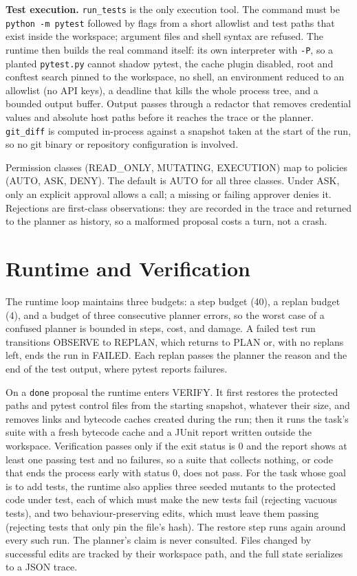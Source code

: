 \documentclass[conference]{IEEEtran}
\begin{document}
\textbf{Test execution.} \texttt{run\_tests} is the only execution tool. The
command must be \texttt{python -m pytest} followed by flags from a short
allowlist and test paths that exist inside the workspace; argument files and
shell syntax are refused. The runtime then builds the real command itself:
its own interpreter with \texttt{-P}, so a planted \texttt{pytest.py}
cannot shadow pytest, the cache plugin disabled, root and conftest search
pinned to the workspace, no shell, an environment reduced to an allowlist
(no API keys), a deadline that kills the whole process tree, and a bounded
output buffer. Output passes through a redactor that removes credential
values and absolute host paths before it reaches the trace or the planner.
\texttt{git\_diff} is computed in-process against a snapshot taken at the
start of the run, so no git binary or repository configuration is involved.

Permission classes (READ\_ONLY, MUTATING, EXECUTION) map to policies
(AUTO, ASK, DENY). The default is AUTO for all three classes. Under ASK, only
an explicit approval allows a call; a missing or failing approver denies it.
Rejections are first-class observations: they are recorded in the trace and
returned to the planner as history, so a malformed proposal costs a turn,
not a crash.

\section{Runtime and Verification}
\label{sec:runtime}
The runtime loop maintains three budgets: a step budget (40), a replan
budget (4), and a budget of three consecutive planner errors, so the worst
case of a confused planner is bounded in steps, cost, and damage. A failed
test run transitions OBSERVE to REPLAN, which returns to PLAN or, with no
replans left, ends the run in FAILED. Each replan passes the planner the
reason and the end of the test output, where pytest reports failures.

On a \texttt{done} proposal the runtime enters VERIFY. It first restores the
protected paths and pytest control files from the starting snapshot,
whatever their size, and removes links and bytecode caches created during
the run; then it runs the task's suite with a fresh bytecode cache and a
JUnit report written outside the workspace. Verification passes only if the
exit status is 0 and the report shows at least one passing test and no
failures, so a suite that collects nothing, or code that ends the process
early with status 0, does not pass. For the task whose goal is to add tests,
the runtime also applies three seeded mutants to the protected code under
test, each of which must make the new tests fail (rejecting vacuous tests),
and two behaviour-preserving edits, which must leave them passing
(rejecting tests that only pin the file's hash). The restore step runs again
around every such run. The planner's claim is never consulted. Files changed by successful
edits are tracked by their workspace path, and the full state serializes to
a JSON trace.
\end{document}
